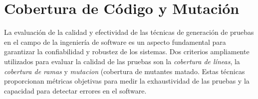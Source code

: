 



    








\section{Cobertura de Código y Mutación}
\label{sec:coverage}
La evaluación de la calidad y efectividad de las técnicas de generación de pruebas en el campo de la ingeniería de software es un aspecto fundamental para garantizar la confiabilidad y robustez de los sistemas. Dos criterios ampliamente utilizados para evaluar la calidad de las pruebas son la \emph{cobertura de líneas}, la \emph{cobertura de ramas} y \emph{mutacion} (cobertura de mutantes matado. Estas técnicas proporcionan métricas objetivas para medir la exhaustividad de las pruebas y la capacidad para detectar errores en el software.

